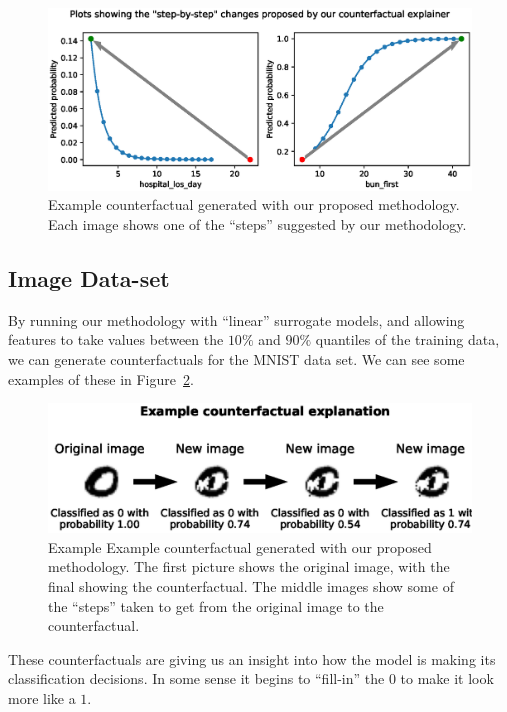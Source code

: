 \documentclass{article}
\begin{document}
\begin{figure}
    \centering
    \includegraphics[width=\linewidth]{figures/mimic_counterfactual_example.eps}
    \caption{Example counterfactual generated with our proposed methodology. Each image shows one of the ``steps'' suggested by our methodology.\label{figure:mimic_counterfactuals}}
\end{figure}

\subsection{Image Data-set}
By running our methodology with ``linear'' surrogate models, and allowing features to take values between the \(10\%\) and \(90\%\) quantiles of the training data, we can generate counterfactuals for the MNIST data set. We can see some examples of these in Figure~\ref{figure:mnist_counterfactuals}.

\begin{figure}
    \centering
    \includegraphics[width=\linewidth]{figures/mnist_counterfactual_example.eps}
    \caption{Example Example counterfactual generated with our proposed methodology. The first picture shows the original image, with the final showing the counterfactual. The middle images show some of the ``steps'' taken to get from the original image to the counterfactual.\label{figure:mnist_counterfactuals}}
\end{figure}

These counterfactuals are giving us an insight into how the model is making its classification decisions. In some sense it begins to ``fill-in'' the \(0\) to make it look more like a \(1\). 
\end{document}

